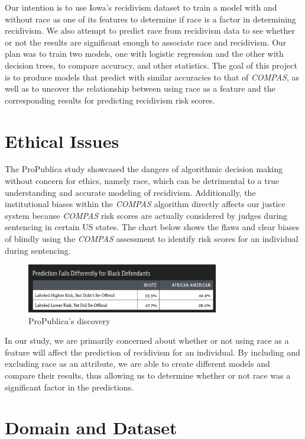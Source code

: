 \documentclass[11pt, sigconf]{acmart}
\begin{document}
Our intention is to use Iowa’s recidivism dataset to train a model with and without race as one of its features to determine if race is a factor in determining recidivism. We also attempt to predict race from recidivism data to see whether or not the results are significant enough to associate race and recidivism. Our plan was to train two models, one with logistic regression and the other with decision trees, to compare accuracy, and other statistics. The goal of this project is to produce models that predict with similar accuracies to that of \emph{COMPAS}, as well as to uncover the relationship between using race as a feature and the corresponding results for predicting recidivism risk scores.

\section{Ethical Issues}

\hspace{5mm}The ProPublica study showcased the dangers of algorithmic decision making without concern for ethics, namely race, which can be detrimental to a true understanding and accurate modeling of recidivism. Additionally, the institutional biases within the \emph{COMPAS} algorithm directly affects our justice system because \emph{COMPAS} risk scores are actually considered by judges during sentencing in certain US states. The chart below shows the flaws and clear biases of blindly using the \emph{COMPAS} assessment to identify risk scores for an individual during sentencing.  
\begin{figure}[h] 	
\centering
\includegraphics[width=3.3in]{asdf.png}
\caption{ProPublica's discovery}
\end{figure}


In our study, we are primarily concerned about whether or not using race as a feature will affect the prediction of recidivism for an individual. By including and excluding race as an attribute, we are able to create different models and compare their results, thus allowing us to determine whether or not race was a significant factor in the predictions.


\section{Domain and Dataset}
\end{document}
